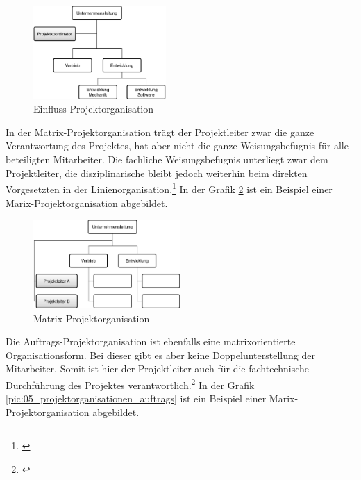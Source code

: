 \begin{figure}[htbp]
\begin{center}
\includegraphics[width=0.45\textwidth,angle=0]{./bilder/theorie/05_projektorganisationen_einfluss.pdf}
\caption{Einfluss-Projektorganisation}
\label{pic:05_projektorganisationen_einfluss}
\end{center}
\end{figure}

In der Matrix-Projektorganisation trägt der Projektleiter zwar die ganze Verantwortung
des Projektes, hat aber nicht die ganze Weisungsbefugnis für alle beteiligten Mitarbeiter.
Die fachliche Weisungsbefugnis unterliegt zwar dem Projektleiter, die disziplinarische
bleibt jedoch weiterhin beim direkten Vorgesetzten in der Linienorganisation.\footnote{\citealp*[Vgl.][S. 58]{burghardt2007einfuehrung}}
In der Grafik \ref{pic:05_projektorganisationen_matrix} ist ein Beispiel einer 
Marix-Projektorganisation abgebildet.

\begin{figure}[htbp]
\begin{center}
\includegraphics[width=0.5\textwidth,angle=0]{./bilder/theorie/05_projektorganisationen_matrix.pdf}
\caption{Matrix-Projektorganisation}
\label{pic:05_projektorganisationen_matrix}
\end{center}
\end{figure}

Die Auftrags-Projektorganisation ist ebenfalls eine matrixorientierte 
Organisationsform. Bei dieser gibt es aber keine Doppelunterstellung der Mitarbeiter.
Somit ist hier der Projektleiter auch für die fachtechnische Durchführung des
Projektes verantwortlich.\footnote{\citealp*[Vgl.][S. 58]{burghardt2007einfuehrung}}
In der Grafik \ref{pic:05_projektorganisationen_auftrags}
ist ein Beispiel einer Marix-Projektorganisation abgebildet.

